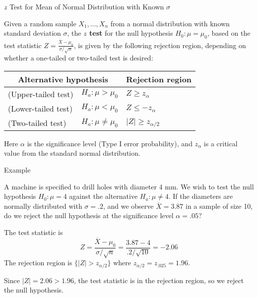\documentclass[handout]{beamer}
\renewcommand{\emph}{\textbf}
\begin{document}
\begin{frame}{$z$ Test for Mean of Normal Distribution with Known $\sigma$}
\begin{block}{}
Given a random sample $X_1,\dots,X_n$ from a normal distribution with known standard deviation $\sigma$, the \emph{$z$ test} for the null hypothesis $H_0: \mu=\mu_0$, based on the test statistic $Z=\frac{\overline X-\mu_0}{\sigma/\sqrt{n}}$, is given by the following rejection region, depending on whether a one-tailed or two-tailed test is desired:
\begin{center}
\begin{tabular}{ll|l}
\multicolumn{2}{c}{Alternative hypothesis} & Rejection region \\ \hline
(Upper-tailed test) & $H_a: \mu>\mu_0$ & $Z\geq z_{\alpha}$ \\
(Lower-tailed test) & $H_a: \mu<\mu_0$ & $Z\leq -z_{\alpha}$ \\
(Two-tailed test) & $H_a: \mu\neq\mu_0$ & $|Z|\geq z_{\alpha/2}$\\
\end{tabular}
\end{center}
Here $\alpha$ is the significance level (Type I error probability), and $z_{\alpha}$ is a critical value from the standard normal distribution.
\end{block}
\end{frame}

\begin{frame}{Example}
\begin{block}{}
A machine is specified to drill holes with diameter 4 mm. We wish to test the null hypothesis $H_0: \mu=4$ against the alternative $H_a: \mu\neq 4$. If the diameters are normally distributed with $\sigma=.2$, and we observe $\overline X=3.87$ in a sample of size 10, do we reject the null hypothesis at the significance level $\alpha=.05$?
\end{block}

\pause
The test statistic is 
$$Z=\frac{\overline X-\mu_0}{\sigma/\sqrt{n}}=\frac{3.87-4}{.2/\sqrt{10}}=-2.06$$
\pause The rejection region is $\{|Z|>z_{\alpha/2}\}$ where $z_{\alpha/2}=z_{.025}=1.96$.

\vspace{.2cm}
\pause Since $|Z|=2.06>1.96$, the test statistic is in the rejection region, so we reject the null hypothesis.
\end{frame}
\end{document}
